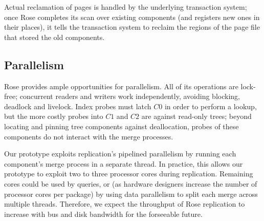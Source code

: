 \documentclass{vldb}
\newcommand{\rows}{Rose\xspace}
\begin{document}
Actual reclamation of pages is handled by the underlying transaction
system; once \rows completes its scan over existing components (and
registers new ones in their places), it tells the transaction system
to reclaim the regions of the page file that stored the old components.

\subsection{Parallelism}

\rows provides ample opportunities for parallelism.  All of its
operations are lock-free; concurrent readers and writers work
independently, avoiding blocking, deadlock and livelock.  Index probes
must latch $C0$ in order to perform a lookup, but the more costly
probes into $C1$ and $C2$ are against read-only trees; beyond locating
and pinning tree components against deallocation, probes of these
components do not interact with the merge processes.

Our prototype exploits replication's pipelined parallelism by running
each component's merge process in a separate thread.  In practice,
this allows our prototype to exploit two to three processor cores
during replication.  Remaining cores could be used by queries, or (as
hardware designers increase the number of processor cores per package)
by using data parallelism to split each merge across multiple threads.
Therefore, we expect the throughput of \rows replication to increase
with bus and disk bandwidth for the forseeable future.


\end{document}
